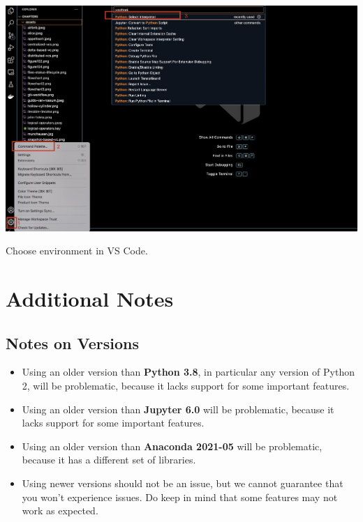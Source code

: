 \documentclass{latex-template/tufte-handout}
\begin{document}
\begin{marginfigure}%
  \includegraphics[width=1.3\linewidth]{assets/08-choose-env-vscode.jpg}
  \caption{Choose environment in VS Code.}
  \label{fig:environment-vscode}
\end{marginfigure}







\section{Additional Notes}
\label{additional-notes}



\subsection{Notes on Versions}\label{notes-on-versions}

\begin{itemize}
	\item Using an older version than \textbf{Python 3.8}, in particular any version of Python 2, will be problematic, because it lacks support for some important features.
	\item Using an older version than \textbf{Jupyter 6.0} will be problematic, because it lacks support for some important features.
	\item Using an older version than \textbf{Anaconda 2021-05} will be problematic, because it has a different set of libraries.
	\item Using newer versions should not be an issue, but we cannot guarantee that you won't experience issues. Do keep in mind that some features may not work as expected.
\end{itemize}
\end{document}
